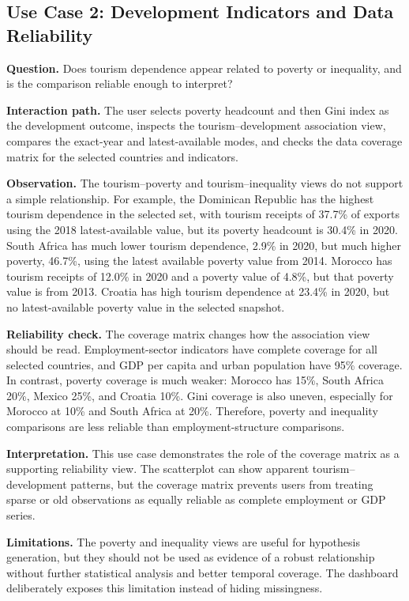 \documentclass{vgtc}
\begin{document}
\subsection{Use Case 2: Development Indicators and Data Reliability}

\textbf{Question.} Does tourism dependence appear related to poverty or inequality, and is the comparison reliable enough to interpret?

\textbf{Interaction path.} The user selects poverty headcount and then Gini index as the development outcome, inspects the tourism--development association view, compares the exact-year and latest-available modes, and checks the data coverage matrix for the selected countries and indicators.

\textbf{Observation.} The tourism--poverty and tourism--inequality views do not support a simple relationship. For example, the Dominican Republic has the highest tourism dependence in the selected set, with tourism receipts of 37.7\% of exports using the 2018 latest-available value, but its poverty headcount is 30.4\% in 2020. South Africa has much lower tourism dependence, 2.9\% in 2020, but much higher poverty, 46.7\%, using the latest available poverty value from 2014. Morocco has tourism receipts of 12.0\% in 2020 and a poverty value of 4.8\%, but that poverty value is from 2013. Croatia has high tourism dependence at 23.4\% in 2020, but no latest-available poverty value in the selected snapshot.

\textbf{Reliability check.} The coverage matrix changes how the association view should be read. Employment-sector indicators have complete coverage for all selected countries, and GDP per capita and urban population have 95\% coverage. In contrast, poverty coverage is much weaker: Morocco has 15\%, South Africa 20\%, Mexico 25\%, and Croatia 10\%. Gini coverage is also uneven, especially for Morocco at 10\% and South Africa at 20\%. Therefore, poverty and inequality comparisons are less reliable than employment-structure comparisons.

\textbf{Interpretation.} This use case demonstrates the role of the coverage matrix as a supporting reliability view. The scatterplot can show apparent tourism--development patterns, but the coverage matrix prevents users from treating sparse or old observations as equally reliable as complete employment or GDP series.

\textbf{Limitations.} The poverty and inequality views are useful for hypothesis generation, but they should not be used as evidence of a robust relationship without further statistical analysis and better temporal coverage. The dashboard deliberately exposes this limitation instead of hiding missingness.
\end{document}
